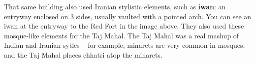\documentclass[class=article, crop=false]{standalone}
\begin{document}
That same building also used Iranian stylistic elements, such as \textbf{iwan}: an entryway enclosed on 3 sides, usually vaulted with a pointed arch. You can see an iwan at the entryway to the Red Fort in the image above. They also used these mosque-like elements for the Taj Mahal. The Taj Mahal was a real mashup of Indian and Iranian sytles -- for example, minarets are very common in mosques, and the Taj Mahal places chhatri atop the minarets.
\end{document}
